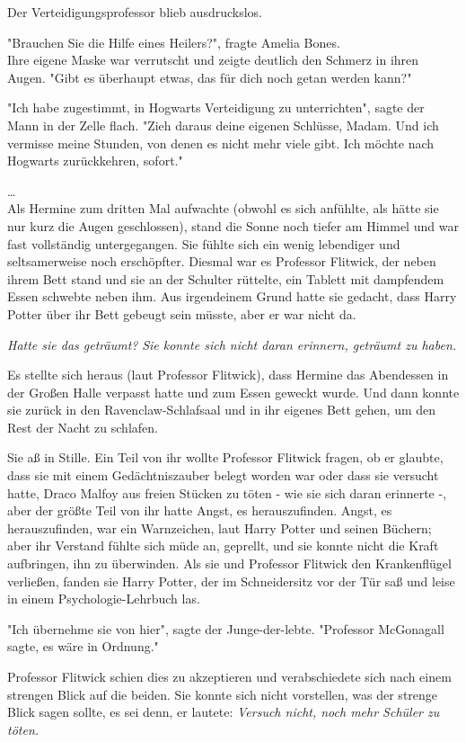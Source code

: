 {Der Verteidigungsprofessor blieb ausdruckslos.

"Brauchen Sie die Hilfe eines Heilers?", fragte Amelia Bones.\\ Ihre eigene Maske war verrutscht und zeigte deutlich den Schmerz in ihren Augen. "Gibt es überhaupt etwas, das für dich noch getan werden kann?"

"Ich habe zugestimmt, in Hogwarts Verteidigung zu unterrichten", sagte der Mann in der Zelle flach. "Zieh daraus deine eigenen Schlüsse, Madam. Und ich vermisse meine Stunden, von denen es nicht mehr viele gibt. Ich möchte nach Hogwarts zurückkehren, sofort."

…\\ Als Hermine zum dritten Mal aufwachte (obwohl es sich anfühlte, als hätte sie nur kurz die Augen geschlossen), stand die Sonne noch tiefer am Himmel und war fast vollständig untergegangen. Sie fühlte sich ein wenig lebendiger und seltsamerweise noch erschöpfter. Diesmal war es Professor Flitwick, der neben ihrem Bett stand und sie an der Schulter rüttelte, ein Tablett mit dampfendem Essen schwebte neben ihm. Aus irgendeinem Grund hatte sie gedacht, dass Harry Potter über ihr Bett gebeugt sein müsste, aber er war nicht da.

\emph{Hatte sie das geträumt?} \emph{Sie konnte sich nicht daran erinnern, geträumt zu haben.}

Es stellte sich heraus (laut Professor Flitwick), dass Hermine das Abendessen in der Großen Halle verpasst hatte und zum Essen geweckt wurde. Und dann konnte sie zurück in den Ravenclaw-Schlafsaal und in ihr eigenes Bett gehen, um den Rest der Nacht zu schlafen.

Sie aß in Stille. Ein Teil von ihr wollte Professor Flitwick fragen, ob er glaubte, dass sie mit einem Gedächtniszauber belegt worden war oder dass sie versucht hatte, Draco Malfoy aus freien Stücken zu töten - wie sie sich daran erinnerte -, aber der größte Teil von ihr hatte Angst, es herauszufinden. Angst, es herauszufinden, war ein Warnzeichen, laut Harry Potter und seinen Büchern; aber ihr Verstand fühlte sich müde an, geprellt, und sie konnte nicht die Kraft aufbringen, ihn zu überwinden. Als sie und Professor Flitwick den Krankenflügel verließen, fanden sie Harry Potter, der im Schneidersitz vor der Tür saß und leise in einem Psychologie-Lehrbuch las.

"Ich übernehme sie von hier", sagte der Junge-der-lebte. "Professor McGonagall sagte, es wäre in Ordnung."

Professor Flitwick schien dies zu akzeptieren und verabschiedete sich nach einem strengen Blick auf die beiden. Sie konnte sich nicht vorstellen, was der strenge Blick sagen sollte, es sei denn, er lautete: \emph{Versuch nicht, noch mehr Schüler zu töten.}

}
